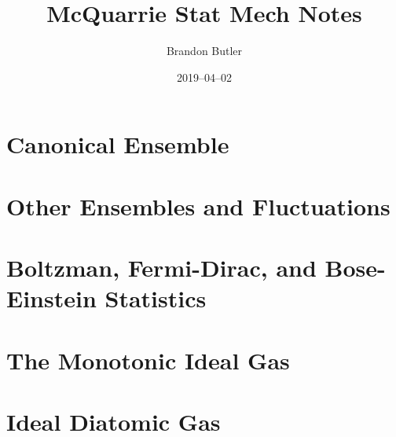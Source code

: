 \documentclass{report}
\title{McQuarrie Stat Mech Notes}
\author{Brandon Butler}
\date{2019--04--02}
\begin{document}
\chapter{Canonical Ensemble}

\chapter{Other Ensembles and Fluctuations}

\chapter{Boltzman, Fermi-Dirac, and Bose-Einstein Statistics}

\chapter{The Monotonic Ideal Gas}

\chapter{Ideal Diatomic Gas}

\end{document}
